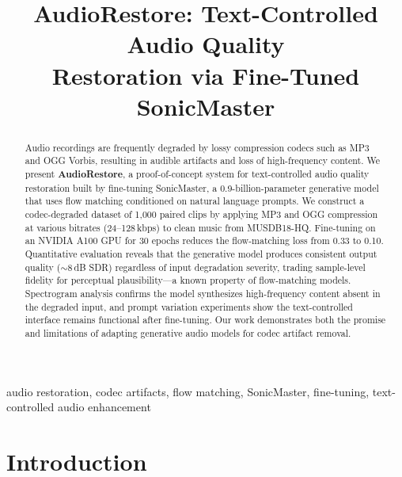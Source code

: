 \documentclass[conference]{IEEEtran}
\begin{document}
\title{AudioRestore: Text-Controlled Audio Quality\\Restoration via Fine-Tuned SonicMaster}

\author{
}

\maketitle

\begin{abstract}
Audio recordings are frequently degraded by lossy compression codecs such as
MP3 and OGG Vorbis, resulting in audible artifacts and loss of high-frequency
content. We present \textbf{AudioRestore}, a proof-of-concept system for
text-controlled audio quality restoration built by fine-tuning SonicMaster, a
0.9-billion-parameter generative model that uses flow matching conditioned on
natural language prompts. We construct a codec-degraded dataset of 1{,}000
paired clips by applying MP3 and OGG compression at various bitrates
(24--128\,kbps) to clean music from MUSDB18-HQ. Fine-tuning on an
NVIDIA A100 GPU for 30 epochs reduces the flow-matching loss from 0.33 to
0.10. Quantitative evaluation reveals that the generative model produces
consistent output quality ($\sim$8\,dB SDR) regardless of input degradation
severity, trading sample-level fidelity for perceptual plausibility---a known
property of flow-matching models. Spectrogram analysis confirms the model
synthesizes high-frequency content absent in the degraded input, and prompt
variation experiments show the text-controlled interface remains functional
after fine-tuning. Our work demonstrates both the promise and limitations of
adapting generative audio models for codec artifact removal.
\end{abstract}

\begin{IEEEkeywords}
audio restoration, codec artifacts, flow matching, SonicMaster, fine-tuning,
text-controlled audio enhancement
\end{IEEEkeywords}

\section{Introduction}
\end{document}
